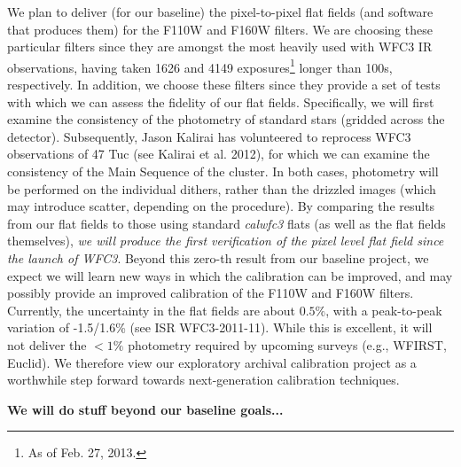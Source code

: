 \documentclass[12pt]{article}
\begin{document}
We plan to deliver (for our baseline) the pixel-to-pixel flat
fields (and software that produces them) for the F110W and F160W
filters.  We are choosing these particular filters since they are
amongst the most heavily used with WFC3 IR observations, having taken
1626 and 4149 exposures\footnote{As of Feb. 27, 2013.} longer than
100s, respectively.  In addition, we choose these filters
since they provide a set of tests with which we can assess the
fidelity of our flat fields.  Specifically, we will first examine the
consistency of the photometry of standard stars (gridded across 
the detector).  Subsequently, Jason Kalirai has volunteered to
reprocess WFC3 observations of 47 Tuc (see Kalirai et al. 2012), for
which we can examine the consistency of the Main Sequence of the
cluster.  In both cases, photometry will be performed on the
individual dithers, rather than the drizzled images (which may
introduce scatter, depending on the procedure).  By comparing the
results from our flat fields to those using standard \emph{calwfc3}
flats (as well as the flat fields themselves), \emph{we will produce
  the first verification of the pixel level flat field since the
  launch of WFC3}.  Beyond this zero-th result from our baseline
project, we expect we will learn new ways in which the calibration can
be improved, and may possibly provide an improved calibration of the
F110W and F160W filters.  Currently, the uncertainty in the flat
fields are about $0.5\%$, with a peak-to-peak variation of -1.5/1.6\%
(see ISR WFC3-2011-11).  While this is excellent, it will not deliver
the $<1\%$ photometry required by upcoming surveys (e.g., WFIRST,
Euclid).  We therefore view our exploratory archival calibration
project as a worthwhile step forward towards next-generation
calibration techniques.

\textbf{We will do stuff beyond our baseline goals...}


%
%
\budgetnarrative       %
\end{document}
